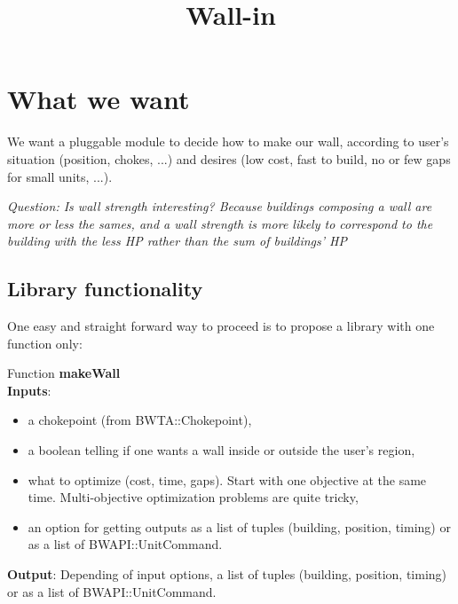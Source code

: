 \documentclass[a4paper,11pt]{article}
\begin{document}
  
\title{Wall-in}
\author{}

\maketitle



\section{What we want}

We want a  pluggable module to decide how to  make our wall, according
to  user's situation (position,  chokes, ...)  and desires  (low cost,
fast to build, no or few gaps for small units, ...).

{\it  Question:  Is   wall  strength  interesting?  Because  buildings
  composing a wall are more or  less the sames, and a wall strength is
  more likely  to correspond to the  building with the  less HP rather
  than the sum of buildings' HP}


\subsection{Library functionality}

One easy and  straight forward way to proceed is  to propose a library
with one function only:

\noindent
Function {\bf makeWall}\\
{\bf Inputs}:
\begin{itemize}
\item a chokepoint (from BWTA::Chokepoint), 
\item a  boolean telling  if one  wants a wall  inside or  outside the
  user's region, 
\item what to  optimize (cost, time, gaps).  Start  with one objective
  at the  same time.  Multi-objective optimization problems  are quite
  tricky, 
\item an  option for  getting outputs as  a list of  tuples (building,
  position, timing) or as a list of BWAPI::UnitCommand. 
\end{itemize}
{\bf Output}: Depending of input options, a list of tuples (building,
position, timing) or as a list of BWAPI::UnitCommand.
\end{document}
